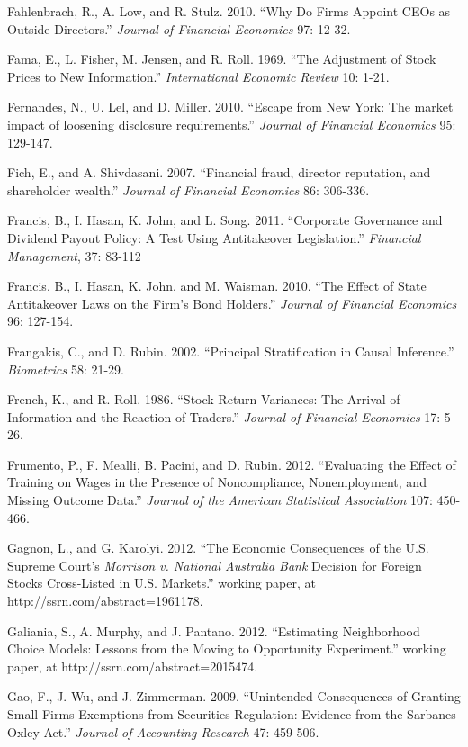 \noindent Fahlenbrach, R., A. Low, and R. Stulz. 2010. ``Why Do Firms Appoint CEOs as Outside Directors.'' \textit{Journal of Financial Economics} 97: 12-32.

\noindent Fama, E., L. Fisher, M. Jensen, and R. Roll.  1969.  ``The Adjustment of Stock Prices to New Information.''  \textit{International Economic Review} 10:  1-21. 

\noindent Fernandes, N., U. Lel, and D. Miller. 2010. ``Escape from New York: The market impact of loosening disclosure requirements.''  \textit{Journal of Financial Economics} 95: 129-147.

\noindent Fich, E., and A. Shivdasani. 2007. ``Financial fraud, director reputation, and shareholder wealth.'' \textit{Journal of Financial Economics} 86: 306-336. 

\noindent Francis, B., I. Hasan, K. John, and L. Song. 2011. ``Corporate Governance and Dividend Payout Policy: A Test Using Antitakeover Legislation.''  \textit{Financial Management}, 37: 83-112

\noindent Francis, B., I. Hasan, K. John, and M. Waisman. 2010. ``The Effect of State Antitakeover Laws on the Firm's Bond Holders.'' \textit{Journal of Financial Economics }96: 127-154.

\noindent Frangakis, C., and D. Rubin. 2002. ``Principal Stratification in Causal Inference.'' \textit{Biometrics} 58: 21-29.

\noindent French, K., and R. Roll.  1986.  ``Stock Return Variances:  The Arrival of Information and the Reaction of Traders.''  \textit{Journal of Financial Economics} 17: 5-26.

\noindent Frumento, P., F. Mealli, B. Pacini, and D. Rubin. 2012. ``Evaluating the Effect of Training on Wages in the Presence of Noncompliance, Nonemployment, and Missing Outcome Data.'' \textit{Journal of the American Statistical Association} 107: 450-466.

\noindent Gagnon, L., and G. Karolyi. 2012. ``The Economic Consequences of the U.S. Supreme Court's \textit{Morrison v. National Australia Bank }Decision for Foreign Stocks Cross-Listed in U.S. Markets.'' working paper, at http://ssrn.com/abstract=1961178.

\noindent Galiania, S., A. Murphy, and J. Pantano. 2012. ``Estimating Neighborhood Choice Models:  Lessons from the Moving to Opportunity Experiment.'' working paper, at http://ssrn.com/abstract=2015474. 

\noindent Gao, F., J. Wu, and J. Zimmerman. 2009. ``Unintended Consequences of Granting Small Firms Exemptions from Securities Regulation: Evidence from the Sarbanes-Oxley Act.''  \textit{Journal of Accounting Research} 47: 459-506.

